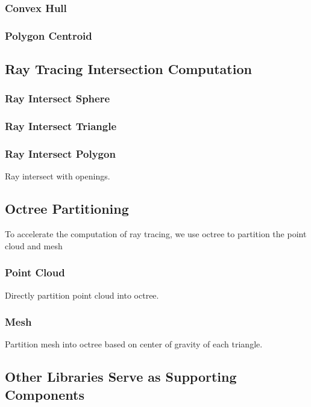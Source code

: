 \documentclass[11pt, a4paper,oneside,chapterprefix=false]{scrbook}
\begin{document}
\subsubsection{Convex Hull}

\subsubsection{Polygon Centroid}

\subsection{Ray Tracing Intersection Computation} \label{sec:ray tracing}

\subsubsection{Ray Intersect Sphere}

\subsubsection{Ray Intersect Triangle}

\subsubsection{Ray Intersect Polygon}

Ray intersect with openings.

\subsection{Octree Partitioning}

To accelerate the computation of ray tracing, we use octree to partition the point cloud and mesh

\subsubsection{Point Cloud}

Directly partition point cloud into octree.

\subsubsection{Mesh}

Partition mesh into octree based on center of gravity of each triangle.

\subsection{Other Libraries Serve as Supporting Components} \label{sec:supporting libraries}
\end{document}
